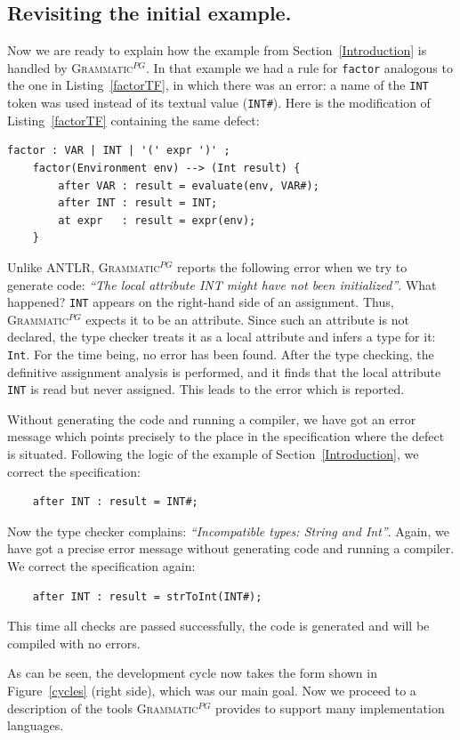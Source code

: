 \documentclass{informat} %
\newcommand{\lstref}[1]{Listing~\ref{#1}}
\newcommand{\figref}[1]{Figure~\ref{#1}}
\newcommand{\secref}[1]{Section~\ref{#1}}
\newcommand{\tool}[1]{\textsc{#1}}
\newcommand{\ATF}{\textsc{Grammatic}$^{PG}$}
\begin{document}
\subsection{Revisiting the initial example.}

Now we are ready to explain how the example from \secref{Introduction} is handled by \ATF{}. In that example we had a rule for \texttt{factor} analogous to the one in \lstref{factorTF}, in which there was an error: a name of the \texttt{INT} token was used instead of its textual value (\texttt{INT\#}). Here is the modification of \lstref{factorTF} containing the same defect:
\begin{lstlisting}
factor : VAR | INT | '(' expr ')' ;          
	factor(Environment env) --> (Int result) { 
		after VAR : result = evaluate(env, VAR#);  
		after INT : result = INT;
		at expr   : result = expr(env);           
	}
\end{lstlisting}
Unlike \tool{ANTLR}, \ATF{} reports the following error when we try to generate code: \emph{``The local attribute INT might have not been initialized''}. What happened? \texttt{INT} appears on the right-hand side of an assignment. Thus, \ATF{} expects it to be an attribute. Since such an attribute is not declared, the type checker treats it as a local attribute and infers a type for it: \texttt{Int}. For the time being, no error has been found. After the type checking, the definitive assignment analysis is performed, and it finds that the local attribute \texttt{INT} is read but never assigned. This leads to the error which is reported.

Without generating the code and running a compiler, we have got an error message which points precisely to the place in the specification where the defect is situated. Following the logic of the example of \secref{Introduction}, we correct the specification:
\begin{lstlisting}
	after INT : result = INT#;
\end{lstlisting}
Now the type checker complains: \emph{``Incompatible types: String and Int''}. Again, we have got a precise error message without generating code and running a compiler. We correct the specification again:
\begin{lstlisting}
	after INT : result = strToInt(INT#);
\end{lstlisting}
This time all checks are passed successfully, the code is generated and will be compiled with no errors.

As can be seen, the development cycle now takes the form shown in \figref{cycles} (right side), which was our main goal. Now we proceed to a description of the tools \ATF{} provides to support many implementation languages.
\end{document}
